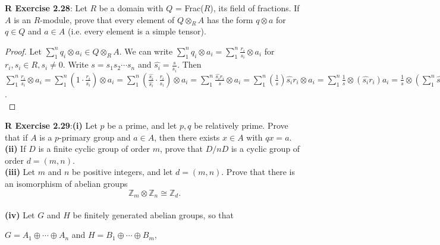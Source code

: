 \documentclass[8pt]{amsart}
\theoremstyle{plain}%
\theoremstyle{definition}
\theoremstyle{remark}
\numberwithin{equation}{section}
\newcommand{\Z}{\mathbb{Z}}
\begin{document}
\textbf{R Exercise 2.28}: Let $R$ be a domain with $Q$ = Frac($R$), its field of fractions. If $A$ is an $R$-module, prove that every element of $Q \otimes_RA$ has the form $q \otimes a$ for $q \in Q $ and $a \in A$ (i.e. every element is a simple tensor).
	\begin{proof}
		Let $\sum_1^n q_i \otimes a_i \in Q \otimes_RA$. We can write $\sum_1^n q_i \otimes a_i = \sum_1^n \frac{r_i}{s_i} \otimes a_i$ for $r_i,s_i \in R, s_i \neq 0$. Write $s=s_1s_2\cdots s_n$ and $\widehat{s_i}=\frac{s}{s_i}$. Then $\sum_1^n \frac{r_i}{s_i} \otimes a_i = \sum_1^n (1 \cdot \frac{r_i}{s_i}) \otimes a_i = \sum_1^n (\frac{\widehat{s_i}}{\widehat{s_i}} \cdot \frac{r_i}{s_i}) \otimes a_i = \sum_1^n \frac{\widehat{s_i}r_i}{s} \otimes a_i = \sum_1^n (\frac{1}{s})\widehat{s_i}r_i \otimes a_i = \sum_1^n \frac{1}{s} \otimes (\widehat{s_i}r_i)a_i = \frac{1}{s} \otimes (\sum_1^n \widehat{s_i}r_ia_i)$.\\
	\end{proof}
	
	\textbf{R Exercise 2.29}:\textbf{(i)} Let $p$ be a prime, and let $p,q$ be relatively prime. Prove that if $A$ is a $p$-primary group and $a \in A$, then there exists $x \in A$ with $qx=a$. \\

\indent \textbf{(ii)} If $D$ is a finite cyclic group of order $m$, prove that $D/nD$ is a cyclic group of order $d=(m,n)$. \\

\indent \textbf{(iii)} Let $m$ and $n$ be positive integers, and let $d =(m,n)$. Prove that there is an isomorphism of abelian groups $$\Z_m \otimes \Z_n \cong \Z_d.$$ \\
\indent \textbf{(iv)} Let $G$ and $H$ be finitely generated abelian groups, so that \\

	\begin{center}
$G=A_1 \oplus \cdots \oplus A_n$ and $H=B_1 \oplus \cdots \oplus B_m,$  \\
	\end{center} 
	
\end{document}
